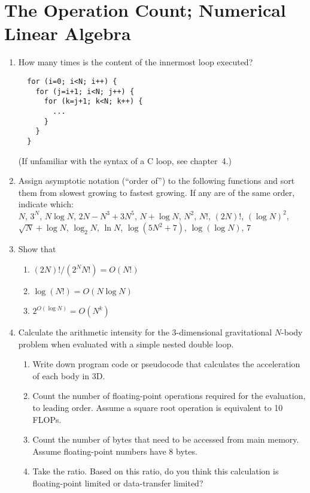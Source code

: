 \documentclass{article}
\begin{document}
\section{The Operation Count; Numerical Linear Algebra}
\begin{enumerate}

\item
How many times is the content of the innermost loop executed?
\begin{verbatim}
  for (i=0; i<N; i++) {
    for (j=i+1; i<N; j++) {
      for (k=j+1; k<N; k++) {
        ...
      }
    }
  }
\end{verbatim}
(If unfamiliar with the syntax of a C loop, see chapter~4.)


\item
  Assign asymptotic notation (``order of'') to the following functions and sort them from slowest growing to fastest growing.
  If any are of the same order, indicate which:\\
$N$,  $3^N$, $N\log N$, 
$2N-N^3 +3N^5$, $N +\log N$, $N^2$,  $N!$, $(2N)!$, 
$(\log N)^2$, $\sqrt{N} + \log N$, $\log_2 N$, $\ln N$, 
$\log (5N^2+7)$, $\log(\log N)$, $7$


\item Show that
  \begin{enumerate} \setlength{\itemsep}{0pt}
  \item $(2N)! / (2^N N!)  = O(N!)$
  \item $\log(N!) = O(N \log N)$
  \item $2^{O(\log N)} = O(N^k)$
\end{enumerate}

  
\item {}
Calculate the arithmetic intensity for the 3-dimensional gravitational $N$-body problem when evaluated with a simple nested double loop.
\vspace{-1em}
\begin{enumerate} \setlength{\itemsep}{0pt}
\item Write down program code or pseudocode that calculates the acceleration of each body
in 3D.
\item Count the number of floating-point operations required for
the evaluation, to leading order. Assume a square root operation is equivalent to 10 FLOPs. 
\item Count the number of bytes that need to be
accessed from main memory. Assume floating-point numbers have 8 bytes. 
\item Take the ratio.
Based on this ratio, do you think this calculation is floating-point
limited or data-transfer limited?
\end{enumerate}

\end{enumerate}
\end{document}
